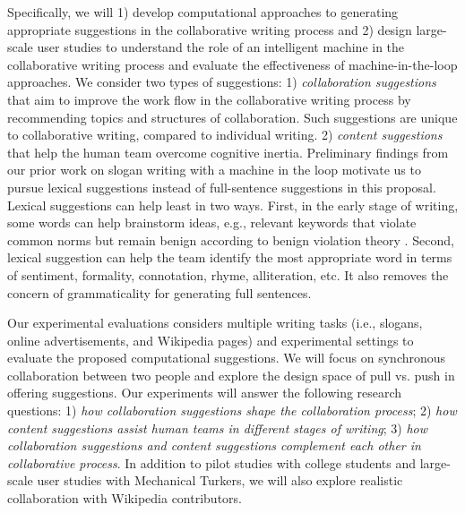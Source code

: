 Specifically, we will 1) develop computational approaches to generating appropriate suggestions in the collaborative writing process and 2) design large-scale user studies to understand the role of an intelligent machine in the collaborative writing process and evaluate the effectiveness of machine-in-the-loop approaches.
We consider two types of suggestions:
1) {\em collaboration suggestions} that aim to improve the work flow in the collaborative writing process by recommending topics and structures of collaboration.
Such suggestions are unique to collaborative writing, compared to individual writing.
2) {\em content suggestions} that help the human team overcome cognitive inertia.
Preliminary findings from our prior work on slogan writing with a machine in the loop motivate us to pursue lexical suggestions instead of full-sentence suggestions in this proposal.
Lexical suggestions can help least in two ways.
First, in the early stage of writing, some words can help brainstorm ideas, e.g., relevant keywords that violate common norms but remain benign according to benign violation theory \citep{warren_opinion:_2015}.
Second, lexical suggestion can help the team identify the most appropriate word in terms of sentiment, formality, connotation, rhyme, alliteration, etc.
It also removes the concern of grammaticality for generating full sentences.

Our experimental evaluations considers multiple writing tasks (i.e., slogans, online advertisements, and Wikipedia pages) and experimental settings to evaluate the proposed computational suggestions.
We will focus on synchronous collaboration between two people and explore the design space of pull vs. push in offering suggestions.
Our experiments will answer the following research questions:
1) {\em how collaboration suggestions shape the collaboration process};
2) {\em how content suggestions assist human teams in different stages of writing};
3) {\em how collaboration suggestions and content suggestions complement each other in collaborative process}.
In addition to pilot studies with college students and large-scale user studies with Mechanical Turkers, we will also explore realistic collaboration with Wikipedia contributors.


